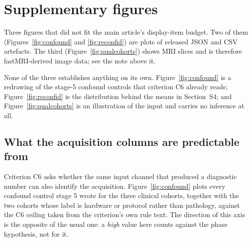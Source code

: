\documentclass[11pt,a4paper]{article}
\begin{document}
\clearpage
\section{Supplementary figures}

Three figures that did not fit the main article's display-item budget. Two of them
(Figures~\ref{fig:confound} and \ref{fig:reconfid}) are plots of released JSON and CSV
artefacts. The third (Figure~\ref{fig:qualcohorts}) shows MRI slices and is therefore
fastMRI-derived image data; see the note above it.

None of the three establishes anything on its own. Figure~\ref{fig:confound} is a
redrawing of the stage-5 confound controls that criterion C6 already reads;
Figure~\ref{fig:reconfid} is the distribution behind the means in Section~S4; and
Figure~\ref{fig:qualcohorts} is an illustration of the input and carries no inference
at all.

\subsection{What the acquisition columns are predictable from}

Criterion C6 asks whether the same input channel that produced a diagnostic number can
also identify the acquisition. Figure~\ref{fig:confound} plots every confound control
stage 5 wrote for the three clinical cohorts, together with the two cohorts whose label
is hardware or protocol rather than pathology, against the C6 ceiling taken from the
criterion's own rule text. The direction of this axis is the opposite of the usual one:
a \emph{high} value here counts against the phase hypothesis, not for it.
\end{document}
